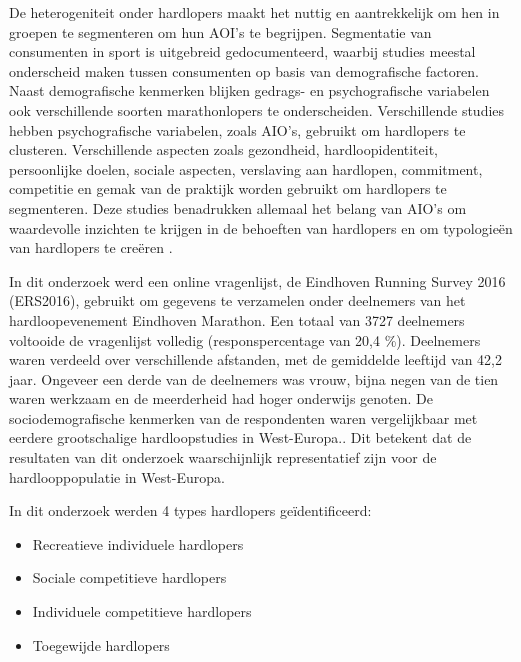     De heterogeniteit onder hardlopers maakt het nuttig en aantrekkelijk om hen in groepen te segmenteren om hun AOI's te begrijpen. 
    Segmentatie van consumenten in sport is uitgebreid gedocumenteerd, waarbij studies meestal onderscheid maken tussen consumenten 
    op basis van demografische factoren. Naast demografische kenmerken blijken gedrags- en psychografische variabelen ook 
    verschillende soorten marathonlopers te onderscheiden. Verschillende studies hebben psychografische variabelen, zoals AIO's, 
    gebruikt om hardlopers te clusteren. Verschillende aspecten zoals gezondheid, hardloopidentiteit, persoonlijke doelen, sociale aspecten, 
    verslaving aan hardlopen, commitment, competitie en gemak van de praktijk worden gebruikt om hardlopers te segmenteren.
    Deze studies benadrukken allemaal het belang van AIO's om waardevolle inzichten te krijgen in de behoeften van hardlopers 
    en om typologieën van hardlopers te creëren \textcite{Janssen2020}. 

    In dit onderzoek werd een online vragenlijst, de Eindhoven Running Survey 2016 (ERS2016), 
    gebruikt om gegevens te verzamelen onder deelnemers van het hardloopevenement Eindhoven Marathon. 
    Een totaal van 3727 deelnemers voltooide de vragenlijst volledig (responspercentage van 20,4 \%). 
    Deelnemers waren verdeeld over verschillende afstanden, met de gemiddelde leeftijd van 42,2 jaar. 
    Ongeveer een derde van de deelnemers was vrouw, bijna negen van de tien waren werkzaam en de meerderheid had hoger onderwijs genoten. 
    De sociodemografische kenmerken van de respondenten waren vergelijkbaar met eerdere grootschalige hardloopstudies in West-Europa.\textcite{Janssen2020}.
    Dit betekent dat de resultaten van dit onderzoek waarschijnlijk representatief zijn voor de hardlooppopulatie in West-Europa.

    In dit onderzoek werden 4 types hardlopers geïdentificeerd:
    \begin{itemize}
        \item Recreatieve individuele hardlopers
        \item Sociale competitieve hardlopers
        \item Individuele competitieve hardlopers
        \item Toegewijde hardlopers
    \end{itemize}

